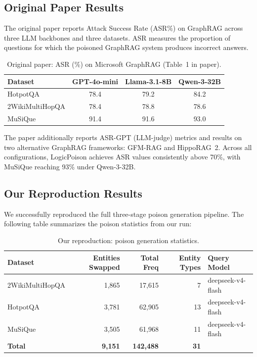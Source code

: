 \documentclass[11pt,a4paper]{article}
\begin{document}
\subsection{Original Paper Results}

The original paper reports Attack Success Rate (ASR\%) on GraphRAG across three
LLM backbones and three datasets.  ASR measures the proportion of questions for
which the poisoned GraphRAG system produces incorrect answers.

\begin{table}[H]
\centering
\caption{Original paper: ASR (\%) on Microsoft GraphRAG (Table~1 in paper).}
\begin{tabular}{l c c c}
\toprule
\textbf{Dataset} & \textbf{GPT-4o-mini} & \textbf{Llama-3.1-8B} & \textbf{Qwen-3-32B} \\
\midrule
HotpotQA        & 78.4 & 79.2 & 84.2 \\
2WikiMultiHopQA & 78.4 & 78.8 & 78.6 \\
MuSiQue         & 91.4 & 91.6 & 93.0 \\
\bottomrule
\end{tabular}
\end{table}

The paper additionally reports ASR-GPT (LLM-judge) metrics and results on two
alternative GraphRAG frameworks: GFM-RAG and HippoRAG~2.  Across all
configurations, LogicPoison achieves ASR values consistently above 70\%, with
MuSiQue reaching 93\% under Qwen-3-32B.

\subsection{Our Reproduction Results}

We successfully reproduced the full three-stage poison generation pipeline.
The following table summarizes the poison statistics from our run:

\begin{table}[H]
\centering
\caption{Our reproduction: poison generation statistics.}
\begin{tabular}{l r r r l}
\toprule
\textbf{Dataset} & \textbf{Entities Swapped} & \textbf{Total Freq} & \textbf{Entity Types} & \textbf{Query Model} \\
\midrule
2WikiMultiHopQA & 1,865 & 17,615 & 7  & deepseek-v4-flash \\
HotpotQA        & 3,781 & 62,905 & 13 & deepseek-v4-flash \\
MuSiQue         & 3,505 & 61,968 & 11 & deepseek-v4-flash \\
\midrule
\textbf{Total}  & \textbf{9,151} & \textbf{142,488} & \textbf{31} & \\
\bottomrule
\end{tabular}
\end{table}
\end{document}
